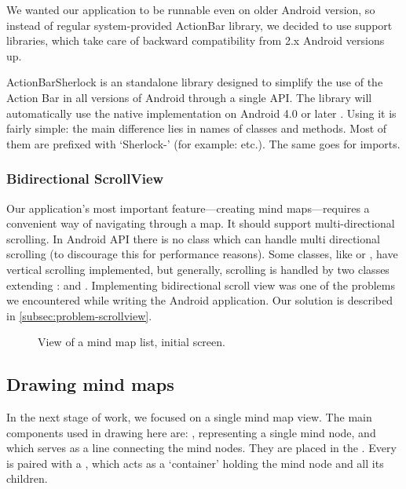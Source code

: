 We wanted our application to be runnable even on older Android version, so instead of regular system-provided ActionBar library, we decided to use support libraries, which take care of backward compatibility from 2.x Android versions up.

ActionBarSherlock is an standalone library designed to simplify the use of the Action Bar in all versions of Android through a single API. The library will automatically use the native  implementation on Android 4.0 or later \cite{Wharton:2013:sherlock}. Using it is fairly simple: the main difference lies in names of  classes and methods. Most of them are prefixed with `Sherlock-' (for example:  etc.). The same goes for imports.

\subsubsection{Bidirectional ScrollView}
\label{subsubsec:action-bar}
Our application's most important feature---creating mind maps---requires a convenient way of navigating through a map. It should support multi-directional scrolling. In Android API there is no class which can handle multi directional scrolling (to discourage this for performance reasons). Some classes, like  or , have vertical scrolling implemented, but generally, scrolling is handled by two classes extending :  and . Implementing bidirectional scroll view was one of the problems we encountered while writing the Android application. Our solution is described in \cref{subsec:problem-scrollview}.

\begin{figure}[h]
	\centering
	\caption{View of a mind map list, initial screen.}
	\label{fig:screen-maplist}
\end{figure}

\subsection{Drawing mind maps}
\label{subsec:drawing}
In the next stage of work, we focused on a single mind map view. The main components used in drawing here are: , representing a single mind node, and  which serves as a line connecting the mind nodes. They are placed in the . Every  is paired with a , which acts as a `container' holding the mind node and all its children.

